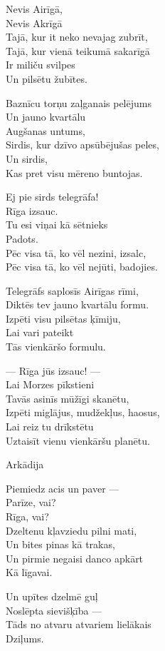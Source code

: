 \documentclass[14pt]{extarticle}
\begin{document}
Nevis Airīgā,\\
Nevis Akrīgā\\
Tajā, kur it neko nevajag zubrīt,\\
Tajā, kur vienā teikumā sakarīgā\\
Ir miliču svilpes\\
Un pilsētu žubītes.

Baznīcu torņu zaļganais pelējums\\
Un jauno kvartālu\\
Augšanas untums,\\
Sirdis, kur dzīvo apsūbējušas peles,\\
Un sirdis,\\
Kas pret visu mēreno buntojas.

Ej pie sirds telegrāfa!\\
Rīga izsauc.\\
Tu esi viņai kā sētnieks\\
Padots.\\
Pēc visa tā, ko vēl nezini, izsalc,\\
Pēc visa tā, ko vēl nejūti, badojies.

Telegrāfs saplosīs Airīgas rīmi,\\
Diktēs tev jauno kvartālu formu.\\
Izpēti visu pilsētas ķīmiju,\\
Lai vari pateikt\\
Tās vienkāršo formulu.

--- Rīga jūs izsauc! ---\\
Lai Morzes pīkstieni\\
Tavās asinīs mūžīgi skanētu,\\
Izpēti miglājus, mudžekļus, haosus,\\
Lai reiz tu drīkstētu\\
Uztaisīt vienu vienkāršu planētu.


\newpage

{\large \sc Arkādija}

Piemiedz acis un paver ---\\
Parīze, vai?\\
Rīga, vai?\\
Dzeltenu kļavziedu pilni mati,\\
Un bites pinas kā trakas,\\
Un pirmie negaisi danco apkārt\\
Kā līgavai.

Un upītes dzelmē guļ\\
Noslēpta sievišķība ---\\
Tāds no atvaru atvariem lielākais\\
Dziļums.
\end{document}
